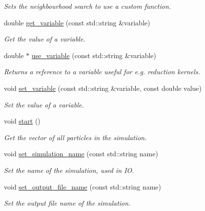\begin{DoxyCompactItemize}
\begin{DoxyCompactList}\small\item\em Sets the neighbourhood search to use a custom function. \end{DoxyCompactList}\item 
double \mbox{\hyperlink{namespacewash_a6c61472c6ffa0cb654bc9497292b7f30}{get\+\_\+variable}} (const std\+::string \&variable)
\begin{DoxyCompactList}\small\item\em Get the value of a variable. \end{DoxyCompactList}\item 
double $\ast$ \mbox{\hyperlink{namespacewash_ad9a1f6575e74c6c12ddbae8d58c2b478}{use\+\_\+variable}} (const std\+::string \&variable)
\begin{DoxyCompactList}\small\item\em Returns a reference to a variable useful for e.\+g. reduction kernels. \end{DoxyCompactList}\item 
void \mbox{\hyperlink{namespacewash_a5045909b6d97db3d92cc44bfd5df70ee}{set\+\_\+variable}} (const std\+::string \&variable, const double value)
\begin{DoxyCompactList}\small\item\em Set the value of a variable. \end{DoxyCompactList}\item 
void \mbox{\hyperlink{namespacewash_a4c8a9913a535b341da9e72826916544b}{start}} ()
\begin{DoxyCompactList}\small\item\em Get the vector of all particles in the simulation. \end{DoxyCompactList}\item 
void \mbox{\hyperlink{namespacewash_a4ddbab848bef96e0fc69bf8e280d4775}{set\+\_\+simulation\+\_\+name}} (const std\+::string name)
\begin{DoxyCompactList}\small\item\em Set the name of the simulation, used in IO. \end{DoxyCompactList}\item 
void \mbox{\hyperlink{namespacewash_ad6de17b9a27f58f6245a68ede303e84b}{set\+\_\+output\+\_\+file\+\_\+name}} (const std\+::string name)
\begin{DoxyCompactList}\small\item\em Set the output file name of the simulation. \end{DoxyCompactList}\item 

\end{DoxyCompactItemize}

